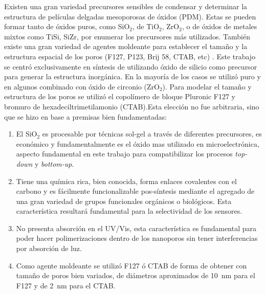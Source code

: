 	Existen una gran variedad precursores sensibles de condensar y determinar la estructura de películas delgadas mesoporosas de óxidos (PDM). Estas se pueden formar tanto de óxidos puros, como SiO$_2$, de TiO$_2$, ZrO$_2$, o de óxidos de metales mixtos como TiSi, SiZr, por enumerar los precursores más utilizados. También existe una gran variedad de agentes moldeante para establecer el tamaño y la estructura espacial de los poros (F127, P123, Brij 58, CTAB, etc) \cite{angelome2011,schuth2013,Soler-Illia2006,Soler-Illia2002a}. Este trabajo se centró exclusivamente en síntesis de \pdm\space utilizando óxido de silicio como precursor para generar la estructura inorgánica. En la mayoría de los casos se utilizó puro y en algunos combinado con óxido de circonio (ZrO$_2$). Para modelar el tamaño y estructura de los poros se utilizó el copolímero de bloque Pluronic F127 y bromuro de hexadeciltrimetilamonio (CTAB).Esta elección no fue arbitraria, sino que se hizo en base a premisas bien fundamentadas:
		
		\begin{enumerate}

		\item El SiO$_2$ es procesable por técnicas sol-gel a través de diferentes precursores, es económico y fundamentalmente es el óxido mas utilizado en microelectrónica, aspecto fundamental en este trabajo para compatibilizar los procesos \textit{top-down} y \textit{bottom-up}.

		\item Tiene una química rica, bien conocida, forma enlaces covalentes con el carbono y es fácilmente funcionalizable pos-síntesis mediante el agregado de una gran variedad de grupos funcionales orgánicos o biológicos. Esta característica resultará fundamental para la selectividad de los sensores.

		\item No presenta absorción en el UV/Vis, esta característica es fundamental para poder hacer polimerizaciones dentro de los nanoporos sin tener interferencias por absorción de luz.

		\item Como agente moldeante se utilizó F127 ó CTAB de forma de obtener \pdm\space con tamaño de poros bien variados, de diámetros aproximados de \SI{10}{\nm} para el F127 y de \SI{2}{\nm} para el CTAB.

		\end{enumerate}
	
